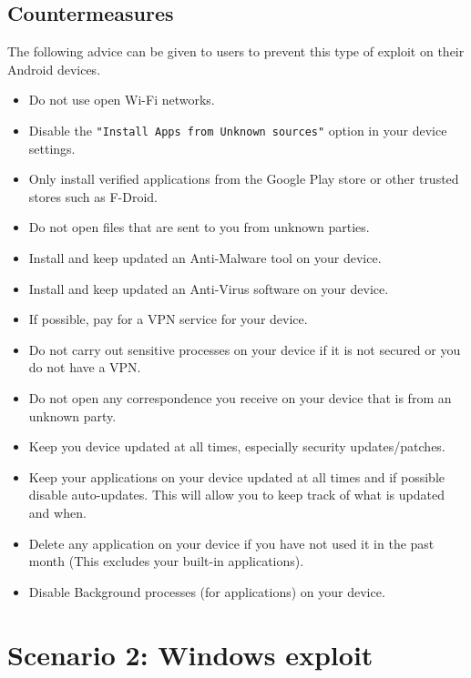 \documentclass[a4paper, 12pt, titlepage]{report}
\begin{document}
\section{Countermeasures}
The following advice can be given to users to prevent this type of exploit on their Android devices.
\begin{itemize}
    \item Do not use open Wi-Fi networks.
    \item Disable the \texttt{"Install Apps from Unknown sources"} option in your device settings.
    \item Only install verified applications from the Google Play store or other trusted stores such as F-Droid.
    \item Do not open files that are sent to you from unknown parties.
    \item Install and keep updated an Anti-Malware tool on your device.
    \item Install and keep updated an Anti-Virus software on your device.
    \item If possible, pay for a VPN service for your device.
    \item Do not carry out sensitive processes on your device if it is not secured or you do not have a VPN.
    \item Do not open any correspondence you receive on your device that is from an unknown party.
    \item Keep you device updated at all times, especially security updates/patches.
    \item Keep your applications on your device updated at all times and if possible disable auto-updates. This will allow you to keep track of what is updated and when.
    \item Delete any application on your device if you have not used it in the past month (This excludes your built-in applications).
    \item Disable Background processes (for applications) on your device.
\end{itemize}
\chapter{Scenario 2: Windows exploit}
\end{document}
